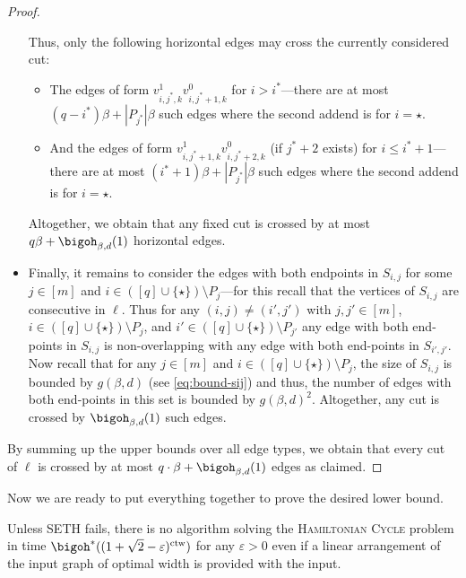 \documentclass[a4paper,UKenglish,cleveref, autoref, thm-restate]{lipics-v2021}
\begin{document}
\begin{proof}
\begin{itemize}
\begin{itemize}
		\end{itemize}
		Thus, only the following horizontal edges may cross the currently considered cut:
		\begin{itemize}
			\item The edges of form $v_{i, j^*, k}^1 v_{i, j^*+1, k}^0$ for $i > i^*$---there are at most $(q - i^*) \beta + |P_{j^*}| \beta$ such edges where the second addend is for $i = \star$.
			\item And the edges of form $v_{i, j^*+1, k}^1 v_{i, j^*+2, k}^0$ (if $j^*+2$ exists) for $i \leq i^*+1$---there are at most $(i^*+1) \beta + |P_{j^*}| \beta$ such edges where the second addend is for $i = \star$.
		\end{itemize}
		Altogether, we obtain that any fixed cut is crossed by at most $q \beta + \bigoh_{\beta, d}(1)$ horizontal edges.
		
		\item Finally, it remains to consider the edges with both endpoints in $S_{i,j}$ for some $j \in [m]$ and $i \in ([q] \cup \{\star\}) \setminus P_j$---for this recall that the vertices of $S_{i,j}$ are consecutive in $\ell$.
		Thus for any $(i, j) \neq (i', j')$ with $j, j' \in [m]$, $i \in ([q] \cup \{\star\}) \setminus P_j$, and $i' \in ([q] \cup \{\star\}) \setminus P_{j'}$ any edge with both end-points in $S_{i,j}$ is non-overlapping with any edge with both end-points in $S_{i',j'}$.
		Now recall that for any $j \in [m]$ and $i \in ([q] \cup \{\star\}) \setminus P_j$, the size of $S_{i, j}$ is bounded by $g(\beta, d)$ (see \eqref{eq:bound-sij}) and thus, the number of edges with both end-points in this set is bounded by $g(\beta, d)^2$.
		Altogether, any cut is crossed by $\bigoh_{\beta, d}(1)$ such edges.
	\end{itemize}
	By summing up the upper bounds over all edge types, we obtain that every cut of $\ell$ is crossed by at most $q \cdot \beta + \bigoh_{\beta, d}(1)$ edges as claimed.
\end{proof}
Now we are ready to put everything together to prove the desired lower bound.
\begin{theorem}
	Unless SETH fails, there is no algorithm solving the {\textsc{Hamiltonian Cycle}} problem in time $\bigoh^*((1+\sqrt{2}-\varepsilon)^{\operatorname{ctw}})$ for any $\varepsilon > 0$ even if a linear arrangement of the input graph of optimal width is provided with the input.
\end{theorem}
\end{document}
